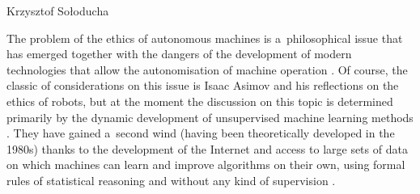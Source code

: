 \begin{artengenv}{Krzysztof Sołoducha}
	
%
%
%
%
%



The problem of the ethics of autonomous machines is a~philosophical issue that has emerged together with the dangers of the development of modern technologies that allow the autonomisation of machine operation
\parencite[][]{pasquale_black_2016}. %
 Of course, the classic of considerations on this issue is Isaac Asimov 
\parencite*[][]{asimov_runaround_2004} %
 and his reflections on the ethics of robots, but at the moment the discussion on this topic is determined primarily by the dynamic development of unsupervised machine learning methods 
\parencite[][]{gryz_sztuczna_2021}. %
 They have gained a~second wind (having been theoretically developed in the 1980s) thanks to the development of the Internet and access to large sets of data on which machines can learn and improve algorithms on their own, using formal rules of statistical reasoning and without any kind of supervision 
\parencite[][]{burrell_how_2016}.%



\end{artengenv}
